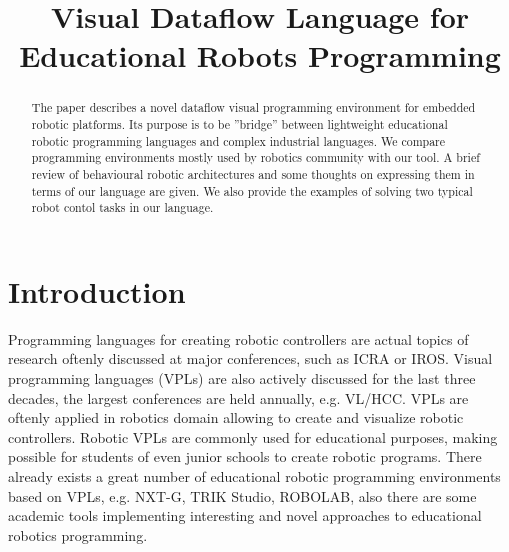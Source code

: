 \documentclass[conference,compsoc]{IEEEtran}
\begin{document}
\title{Visual Dataflow Language for Educational Robots Programming}

\author{
	\and

}

\maketitle



\begin{abstract}
The paper describes a novel dataflow visual programming environment for embedded robotic platforms. Its purpose is to be ''bridge'' between lightweight educational robotic programming languages and complex industrial languages. We compare programming environments mostly used by robotics community with our tool. A brief review of behavioural robotic architectures and some thoughts on expressing them in terms of our language are given. We also provide the examples of solving two typical robot contol tasks in our language.
\end{abstract}

\section{Introduction}

Programming languages for creating robotic controllers are actual topics of research oftenly discussed at major conferences, such as ICRA\cite{Icra} or IROS\cite{Iros2016}. Visual programming languages (VPLs) are also actively discussed for the last three decades, the largest conferences are held annually, e.g. VL/HCC\cite{VLHCC}. VPLs are oftenly applied in robotics domain\cite{banyasad2000visual,simpson2006mobile,simpson2008visual,posso2011process,diprose2011ruru} allowing to create and visualize robotic controllers. Robotic VPLs are commonly used for educational purposes, making possible for students of even junior schools to create robotic programs. There already exists a great number of educational robotic programming environments based on VPLs, e.g. NXT-G\cite{nxtg}, TRIK Studio\cite{trik}, ROBOLAB\cite{robolab}, also there are some academic tools implementing interesting and novel approaches to educational robotics programming\cite{banyasad2000visual,simpson2008visual,diprose2011ruru}.
\end{document}

